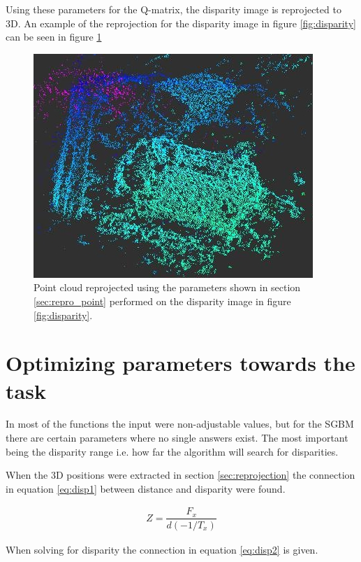 Using these parameters for the Q-matrix, the disparity image is reprojected to 3D. An example of the reprojection for the disparity image in figure \ref{fig:disparity} can be seen in figure \ref{fig:point_repro}


\begin{figure}[h!]
  \centering
    \includegraphics[scale=0.7]{graphics/06_vision/point_cloud_example2.jpg} %
  \caption{Point cloud reprojected using the parameters shown in section \ref{sec:repro_point} performed on the disparity image in figure \ref{fig:disparity}. }
    \label{fig:point_repro}
\end{figure}


\section{ Optimizing parameters towards the task } \label{sec:optimizing_parameters}

In most of the functions the input were non-adjustable values, but for the SGBM there are certain parameters where no single answers exist. The most important being the disparity range i.e. how far the algorithm will search for disparities.


When the 3D positions were extracted in section \ref{sec:reprojection} the connection in equation \ref{eq:disp1} between distance and disparity were found.

\begin{equation}\label{eq:disp1}
\begin{split}
Z = \dfrac{F_{x}}{ d(-1/T_{x})}
\end{split}
\end{equation} 

When solving for disparity the connection in equation \ref{eq:disp2} is given.

